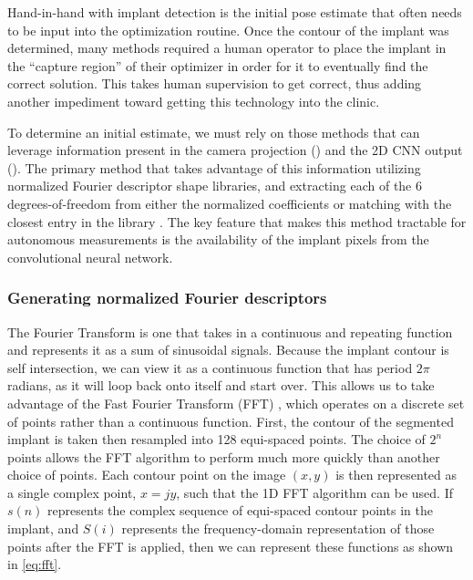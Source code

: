 Hand-in-hand with implant detection is the initial pose estimate that often needs to be input into the optimization routine. Once the contour of the implant was determined, many methods required a human operator to place the implant in the ``capture region'' of their optimizer in order for it to eventually find the correct solution. This takes human supervision to get correct, thus adding another impediment toward getting this technology into the clinic.

To determine an initial estimate, we must rely on those methods that can leverage information present in the camera projection () and the 2D CNN output (). The primary method that takes advantage of this information utilizing normalized Fourier descriptor shape libraries, and extracting each of the 6 degrees-of-freedom from either the normalized coefficients or matching with the closest entry in the library \cite{wallaceAnalysisThreedimensionalMovement1980,wallaceEfficientThreedimensionalAircraft1980,banksModelBased3D1992,banksAccurateMeasurementThreedimensional1996}. The key feature that makes this method tractable for autonomous measurements is the availability of the implant pixels from the convolutional neural network.

\subsubsection{Generating normalized Fourier descriptors}
\label{sec:nfd}
The Fourier Transform is one that takes in a continuous and repeating function and represents it as a sum of sinusoidal signals. Because the implant contour is self intersection, we can view it as a continuous function that has period $2\pi$ radians, as it will loop back onto itself and start over. This allows us to take advantage of the Fast Fourier Transform (FFT) \cite{cochranWhatFastFourier1967}, which operates on a discrete set of points rather than a continuous function. First, the contour of the segmented implant is taken then resampled into 128 equi-spaced points. The choice of $2^n$ points allows the FFT algorithm to perform much more quickly than another choice of points. Each contour point on the image $(x, y)$ is then represented as a single complex point, $x = jy$, such that the 1D FFT algorithm can be used. If $s(n)$ represents the complex sequence of equi-spaced contour points in the implant, and $S(i)$ represents the frequency-domain representation of those points after the FFT is applied, then we can represent these functions as shown in \cref{eq:fft}.

